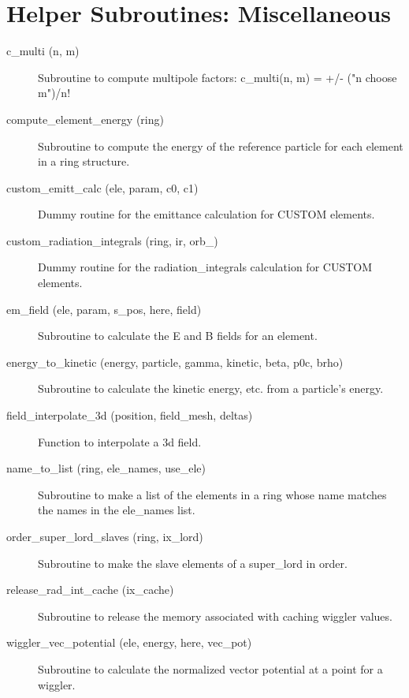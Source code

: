 \section{Helper Subroutines: Miscellaneous}
\label{r:misc_help}

\begin{description}

\item[c\_multi (n, m)] \Newline
Subroutine to compute multipole factors: c\_multi(n, m) = +/- ("n choose m")/n! 

\item[compute\_element\_energy (ring)] \Newline
Subroutine to compute the energy of the reference particle for each element in a ring structure. 

\item[custom\_emitt\_calc (ele, param, c0, c1)] \Newline
Dummy routine for the emittance calculation for CUSTOM elements. 

\item[custom\_radiation\_integrals (ring, ir, orb\_)] \Newline
Dummy routine for the radiation\_integrals calculation for CUSTOM elements. 

\item[em\_field (ele, param, s\_pos, here, field)] \Newline
Subroutine to calculate the E and B fields for an element. 

\item[energy\_to\_kinetic (energy, particle, gamma, kinetic, beta, p0c, brho)] \Newline
Subroutine to calculate the kinetic energy, etc. from a particle's energy. 

\item[field\_interpolate\_3d (position, field\_mesh, deltas)] \Newline
Function to interpolate a 3d field. 

\item[name\_to\_list (ring, ele\_names, use\_ele)] \Newline
Subroutine to make a list of the elements in a ring 
whose name matches the names in the ele\_names list. 

\item[order\_super\_lord\_slaves (ring, ix\_lord)] \Newline
Subroutine to make the slave elements of a super\_lord in order. 

\item[release\_rad\_int\_cache (ix\_cache)] \Newline 
     Subroutine to release the memory associated with caching wiggler values.

\item[wiggler\_vec\_potential (ele, energy, here, vec\_pot)] \Newline
Subroutine to calculate the normalized vector potential at a point for a wiggler.

\end{description}

